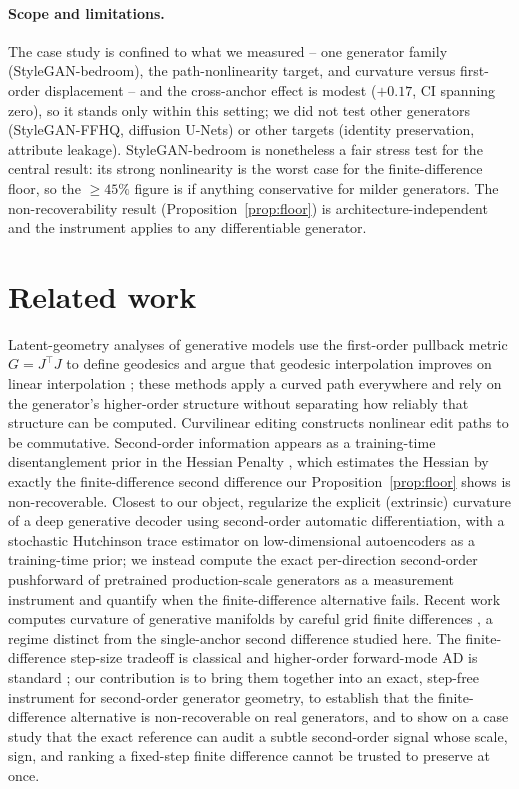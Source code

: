 \documentclass[10pt]{article}
\begin{document}
\paragraph{Scope and limitations.} The case study is confined to what we measured -- one generator
family (StyleGAN-bedroom), the path-nonlinearity target, and curvature versus first-order
displacement -- and the cross-anchor effect is modest ($+0.17$, CI spanning zero), so it stands only
within this setting; we did not test other generators (StyleGAN-FFHQ, diffusion U-Nets) or other
targets (identity preservation, attribute leakage). StyleGAN-bedroom is nonetheless a fair stress
test for the central result: its strong nonlinearity is the worst case for the finite-difference
floor, so the $\geq45\%$ figure is if anything conservative for milder generators. The
non-recoverability result (Proposition~\ref{prop:floor}) is architecture-independent and the
instrument applies to any differentiable generator.

\section{Related work}
\label{sec:related}
Latent-geometry analyses of generative models use the first-order pullback metric $G=J^\top J$ to define
geodesics and argue that geodesic interpolation improves on linear interpolation
\citep{arvanitidis2018,shao2018,chen2018,yang2018}; these methods apply a curved path everywhere and rely
on the generator's higher-order structure without separating how reliably that structure can be computed.
Curvilinear editing \citep{aoshima2023} constructs nonlinear edit paths to be commutative. Second-order
information appears as a training-time disentanglement prior in the Hessian Penalty \citep{peebles2020},
which estimates the Hessian by exactly the finite-difference second difference our
Proposition~\ref{prop:floor} shows is non-recoverable. Closest to our object,
\citet{lee2023} regularize the explicit (extrinsic) curvature of a deep generative decoder
using second-order automatic differentiation, with a stochastic Hutchinson trace estimator
on low-dimensional autoencoders as a training-time prior; we instead compute the exact
per-direction second-order pushforward of pretrained production-scale generators as a
measurement instrument and quantify when the finite-difference alternative fails. Recent work computes curvature of generative
manifolds by careful grid finite differences \citep{koulakis2026}, a regime distinct from the
single-anchor second difference studied here. The finite-difference step-size tradeoff is classical
\citep{press2007,higham2002} and higher-order forward-mode AD is standard \citep{pearlmutter1994,fike2011,griewank2008,baydin2018,cobb2024}; our
contribution is to bring them together into an exact, step-free instrument for second-order generator
geometry, to establish that the finite-difference alternative is non-recoverable on real generators, and
to show on a case study that the exact reference can audit a subtle second-order signal whose scale,
sign, and ranking a fixed-step finite difference cannot be trusted to preserve at once.
\end{document}
